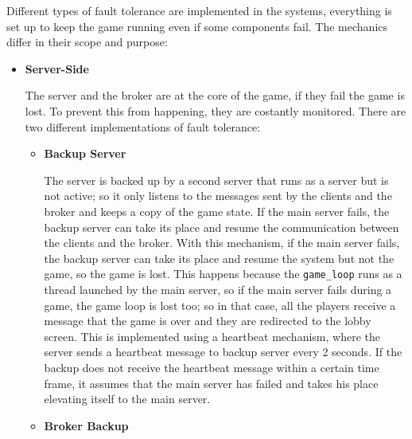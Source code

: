 \documentclass{scrartcl}
\begin{document}
Different types of fault tolerance are implemented in the systems, everything is set up to keep
the game running even if some components fail. \newline
The mechanics differ in their scope and purpose:
\begin{itemize}
      \item
            \textbf{Server-Side} \par
            The server and the broker are at the core of the game, if they fail the game is lost. \newline
            To prevent this from happening, they are costantly monitored.
            There are two different implementations of fault tolerance:
            \begin{itemize}
                  \item \textbf{Backup Server} \par
                        The server is backed up by a second server that runs as a server but is not active; so it only listens to the messages sent by the clients and the broker and keeps a copy of the game state. \newline
                        If the main server fails, the backup server can take its place and resume the communication between the clients and the broker. With this mechanism, if the main server fails, the backup server can take its place and resume the system but not the game, so the game is lost.
                        This happens because the \texttt{game\_loop} runs as a thread launched by the main server, so if the main server fails during a game, the game loop is lost too; so in that case, all the players receive a message that the game is over and they are redirected to the lobby screen. \newline
                        This is implemented using a heartbeat mechanism, where the server sends a heartbeat message to backup server every 2 seconds. If the backup does not receive the heartbeat message within a certain time frame, it assumes that the main server has failed and takes his place elevating itself to the main server. \newline
                  \item \textbf{Broker Backup} \par

\end{itemize}
\end{itemize}
\end{document}

